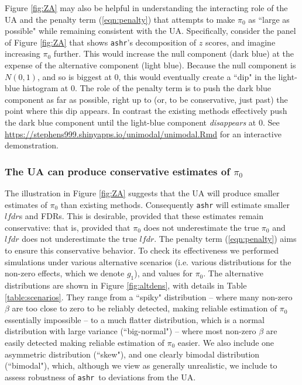 \documentclass[11pt]{article}
\def\lfdr{\textit{lfdr}}
\def\ashr{{\tt ashr}\xspace}
\begin{document}
Figure \ref{fig:ZA} may also be helpful in understanding the interacting role of the UA and the penalty term (\ref{eqn:penalty}) that attempts to make $\pi_0$ as ``large as possible" while remaining consistent with the UA. Specifically, consider the panel of Figure \ref{fig:ZA} that shows \ashr's decomposition of $z$ scores, and imagine increasing $\pi_0$ further. This would increase the null component (dark blue) at the expense of
the alternative component (light blue). Because the null component is $N(0,1)$, and so is biggest at 0, this would eventually create a ``dip" in the light-blue histogram at 0. The role of the penalty term is to push the dark blue component as far as possible, right up to (or, to be conservative, just past) the point where this dip appears. In contrast the 
existing methods effectively push the dark blue component until the light-blue component {\it disappears} at 0. See \href{https://stephens999.shinyapps.io/unimodal/unimodal.Rmd}{https://stephens999.shinyapps.io/unimodal/unimodal.Rmd} for an interactive demonstration.

 \subsubsection*{The UA can produce conservative estimates of $\pi_0$}

The illustration in Figure \ref{fig:ZA} suggests that the UA will produce smaller estimates of $\pi_0$ than existing methods.
Consequently \ashr will estimate smaller $\lfdr$s and FDRs. 
This is desirable, provided that these estimates remain conservative: that is,
provided that $\pi_0$ does not underestimate the true $\pi_0$ and $\lfdr$ does not underestimate the true $\lfdr$.
The penalty term (\ref{eqn:penalty}) aims to ensure this conservative behavior. To check its effectiveness
we performed simulations under various alternative scenarios (i.e. various distributions for the non-zero effects, which we denote $g_1$), and values
for $\pi_0$. The alternative distributions are shown in Figure \ref{fig:altdens}, with details in Table \ref{table:scenarios}.
They range from a ``spiky" distribution -- where many non-zero $\beta$ are
too close to  zero to be reliably detected, making reliable estimation of $\pi_0$ essentially impossible -- to a much
flatter distribution, which is a normal distribution with large variance (``big-normal") -- where most non-zero $\beta$ are easily detected
making reliable estimation of $\pi_0$ easier. We also include one asymmetric distribution (``skew"), and one clearly bimodal distribution (``bimodal"),
which, although we view as generally unrealistic, we include to assess robustness of \ashr~to deviations from the UA.
\end{document}
